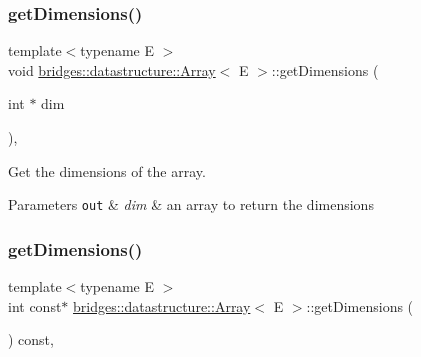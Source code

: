 \subsubsection{\texorpdfstring{get\+Dimensions()}{getDimensions()}\hspace{0.1cm}{\footnotesize\ttfamily [1/2]}}
{\footnotesize\ttfamily template$<$typename E $>$ \\
void \mbox{\hyperlink{classbridges_1_1datastructure_1_1_array}{bridges\+::datastructure\+::\+Array}}$<$ E $>$\+::get\+Dimensions (\begin{DoxyParamCaption}\item[{int $\ast$}]{dim }\end{DoxyParamCaption})\hspace{0.3cm}{\ttfamily [inline]}, {\ttfamily [protected]}}



Get the dimensions of the array. 


\begin{DoxyParams}[1]{Parameters}
\mbox{\tt out}  & {\em dim} & an array to return the dimensions \\
\hline
\end{DoxyParams}
\mbox{\label{classbridges_1_1datastructure_1_1_array_a6d9edc546fa172a47f19de3c2ea93ebf}} 
\subsubsection{\texorpdfstring{get\+Dimensions()}{getDimensions()}\hspace{0.1cm}{\footnotesize\ttfamily [2/2]}}
{\footnotesize\ttfamily template$<$typename E $>$ \\
int const$\ast$ \mbox{\hyperlink{classbridges_1_1datastructure_1_1_array}{bridges\+::datastructure\+::\+Array}}$<$ E $>$\+::get\+Dimensions (\begin{DoxyParamCaption}{ }\end{DoxyParamCaption}) const\hspace{0.3cm}{\ttfamily [inline]}, {\ttfamily [protected]}}

\mbox{\label{classbridges_1_1datastructure_1_1_array_a3b6d694fe5d336a0a15951d522852e51}} 
